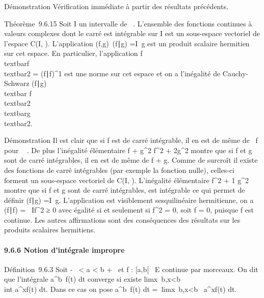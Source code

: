 Démonstration Vérification immédiate à partir des résultats précédents.

Théorème~9.6.15 Soit I un intervalle de ~. L'ensemble des fonctions
continues à valeurs complexes dont le carré est intégrable sur I est un
sous-espace vectoriel de l'espace C(I, ). L'application
(f,g)\mapsto~(f\mathrel∣g)
=\int  I\overlinef~g
est un produit scalaire hermitien sur cet espace. En particulier,
l'application
f\mapsto~\\textbar{}f\\textbar{}2
= (f∣f)^1 est une norme sur cet
espace et on a l'inégalité de Cauchy-Schwarz
\textbar{}(f∣g)\textbar{}\leq\\textbar{}
f\\textbar{}2\\textbar{}g\\textbar{}2.

Démonstration Il est clair que si f est de carré intégrable, il en est
de même de \alpha~f pour \alpha~ \in {}. De plus l'inégalité élémentaire \textbar{}f +
g\textbar{}^2 \textbar{}f\textbar{}^2 +
2\textbar{}g\textbar{}^2 montre que si f et g sont de carré
intégrables, il en est de même de f + g. Comme de surcroît il existe des
fonctions de carré intégrables (par exemple la fonction nulle),
celles-ci forment un sous-espace vectoriel de C(I, ). L'inégalité
élémentaire \textbar{}\overlinefg\textbar{}
 \textbar{}f\textbar{}^2 + 1
 \textbar{}g\textbar{}^2 montre que
si f et g sont de carré intégrables, \overlinegf est
intégrable ce qui permet de définir (f∣g)
=\int  I\overlinef~g.
L'application est visiblement sesquilinéaire hermitienne, on a
(f∣f) =\int ~
I\textbar{}f\textbar{}^2 ≥ 0 avec égalité si et
seulement si \textbar{}f\textbar{}^2 = 0, soit f = 0, puisque
f est continue. Les autres affirmations sont des conséquences des
résultats sur les produits scalaires hermitiens.

\paragraph{9.6.6 Notion d'intégrale impropre}

Définition~9.6.3 Soit -\infty~ \textless{} a \textless{} b \leq +\infty~ et f :
{[}a,b{[}\rightarrow~ E continue par morceaux. On dit que l'intégrale
\int  a^b~f(t) dt converge si
existe
limx\rightarrow~b,x\textless{}b~\\int
 a^xf(t) dt. Dans ce cas on pose
\int  a^b~f(t) dt
=\
limx\rightarrow~b,x\textless{}b\int ~
a^xf(t) dt.


